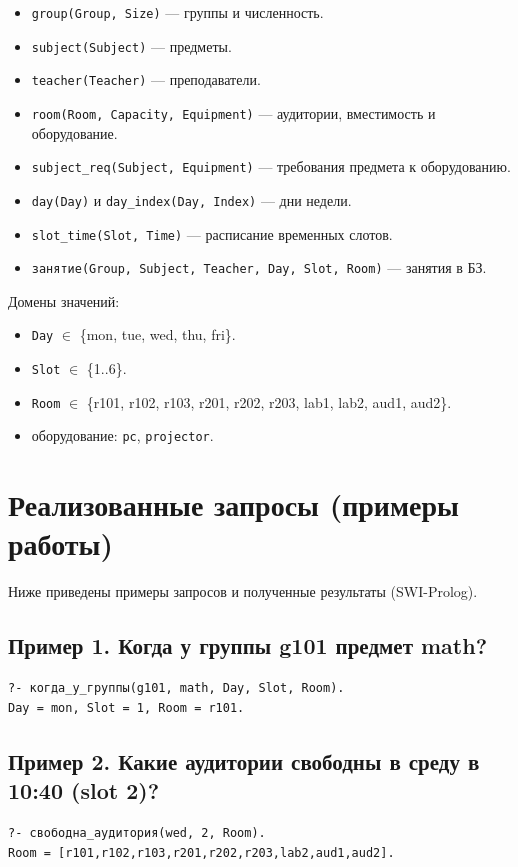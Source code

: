 \documentclass[14pt,a4paper]{extarticle}
\begin{document}
\begin{itemize}[leftmargin=1.25cm]
  \item \texttt{group(Group, Size)} --- группы и численность.
  \item \texttt{subject(Subject)} --- предметы.
  \item \texttt{teacher(Teacher)} --- преподаватели.
  \item \texttt{room(Room, Capacity, Equipment)} --- аудитории, вместимость и оборудование.
  \item \texttt{subject\_req(Subject, Equipment)} --- требования предмета к оборудованию.
  \item \texttt{day(Day)} и \texttt{day\_index(Day, Index)} --- дни недели.
  \item \texttt{slot\_time(Slot, Time)} --- расписание временных слотов.
  \item \texttt{занятие(Group, Subject, Teacher, Day, Slot, Room)} --- занятия в БЗ.
\end{itemize}

Домены значений:
\begin{itemize}[leftmargin=1.25cm]
  \item \texttt{Day} $\in$ \{mon, tue, wed, thu, fri\}.
  \item \texttt{Slot} $\in$ \{1..6\}.
  \item \texttt{Room} $\in$ \{r101, r102, r103, r201, r202, r203, lab1, lab2, aud1, aud2\}.
  \item оборудование: \texttt{pc}, \texttt{projector}.
\end{itemize}

\section{Реализованные запросы (примеры работы)}
Ниже приведены примеры запросов и полученные результаты (SWI-Prolog).

\subsection*{Пример 1. Когда у группы g101 предмет math?}
\begin{verbatim}
?- когда_у_группы(g101, math, Day, Slot, Room).
Day = mon, Slot = 1, Room = r101.
\end{verbatim}

\subsection*{Пример 2. Какие аудитории свободны в среду в 10:40 (slot 2)?}
\begin{verbatim}
?- свободна_аудитория(wed, 2, Room).
Room = [r101,r102,r103,r201,r202,r203,lab2,aud1,aud2].
\end{verbatim}
\end{document}
